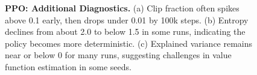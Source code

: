 \begin{figure} 
	\centering
	\caption{\textbf{PPO: Additional Diagnostics.}
		(a) Clip fraction often spikes above 0.1 early, then drops under 0.01 by 100k steps.
		(b) Entropy declines from about 2.0 to below 1.5 in some runs, 
		indicating the policy becomes more deterministic.
		(c) Explained variance remains near or below 0 for many runs, 
		suggesting challenges in value function estimation in some seeds.}
	\label{fig:ppo_additional_losses}
\end{figure}

